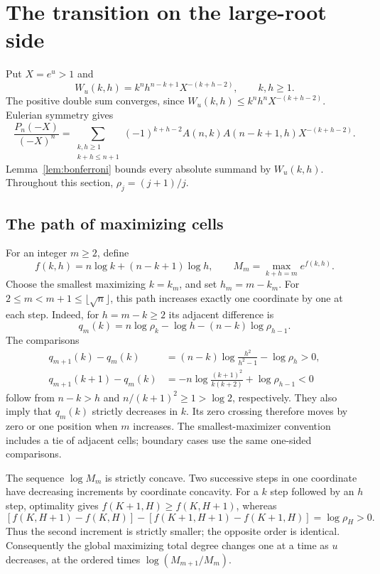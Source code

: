 \section{The transition on the large-root side}\label{sec:bridge}

Put $X=e^u>1$ and
\[
 W_u(k,h)=k^n h^{n-k+1}X^{-(k+h-2)},\qquad k,h\ge1.
\]
The positive double sum converges, since
$W_u(k,h)\le k^nh^nX^{-(k+h-2)}$. Eulerian symmetry gives
\begin{equation}\label{eq:bridge-exact}
 \frac{P_n(-X)}{(-X)^n}
 =\sum_{\substack{k,h\ge1\\k+h\le n+1}}
 (-1)^{k+h-2}A(n,k)A(n-k+1,h)X^{-(k+h-2)}.
\end{equation}
Lemma~\ref{lem:bonferroni} bounds every absolute summand by $W_u(k,h)$.
Throughout this section, $\rho_j=(j+1)/j$.

\subsection{The path of maximizing cells}

For an integer $m\ge2$, define
\[
 f(k,h)=n\log k+(n-k+1)\log h,\qquad
 M_m=\max_{k+h=m}e^{f(k,h)}.
\]
Choose the smallest maximizing $k=k_m$, and set $h_m=m-k_m$.
For $2\le m<m+1\le\lfloor\sqrt n\rfloor$, this path increases exactly
one coordinate by one at each step. Indeed, for $h=m-k\ge2$ its
adjacent difference is
\[
 q_m(k)=n\log\rho_k-\log h-(n-k)\log\rho_{h-1}.
\]
The comparisons
\begin{align*}
 q_{m+1}(k)-q_m(k)
   &=(n-k)\log\frac{h^2}{h^2-1}-\log\rho_h>0,\\
 q_{m+1}(k+1)-q_m(k)
   &=-n\log\frac{(k+1)^2}{k(k+2)}+\log\rho_{h-1}<0
\end{align*}
follow from $n-k>h$ and $n/(k+1)^2\ge1>\log2$, respectively.
They also imply that $q_m(k)$ strictly decreases in $k$. Its zero
crossing therefore moves by zero or one position when $m$ increases.
The smallest-maximizer convention includes a tie of adjacent cells;
boundary cases use the same one-sided comparisons.

The sequence $\log M_m$ is strictly concave. Two successive steps in
one coordinate have decreasing increments by coordinate concavity.
For a $k$ step followed by an $h$ step, optimality gives
$f(K+1,H)\ge f(K,H+1)$, whereas
\[
 [f(K,H+1)-f(K,H)]
 -[f(K+1,H+1)-f(K+1,H)]=\log\rho_H>0.
\]
Thus the second increment is strictly smaller; the opposite order is
identical. Consequently the global maximizing total degree changes
one at a time as $u$ decreases, at the ordered times
$\log(M_{m+1}/M_m)$.

